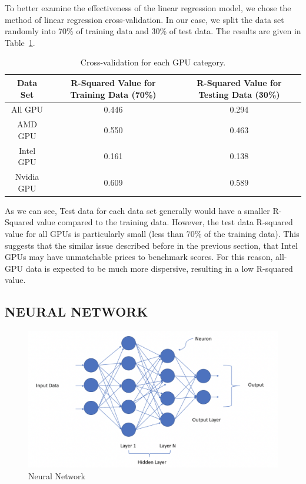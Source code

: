 \documentclass{scrartcl}
\begin{document}
To better examine the effectiveness of the linear regression model, we chose the method of linear regression cross-validation. In our case, we split the data set randomly into 70\% of training data and 30\% of test data. The results are given in Table~\ref{tab:CRSV}. 

\begin{table}[h!]
\centering
\begin{tabular}{|c | c | c|} 
 \hline
Data Set & R-Squared Value for Training Data (70\%) & R-Squared Value for Testing Data (30\%)\\ [0.5ex] 
 \hline\hline
 All GPU & 0.446 & 0.294 \\ 
 AMD GPU & 0.550 & 0.463 \\
 Intel GPU & 0.161 & 0.138 \\ 
 Nvidia GPU & 0.609 & 0.589 \\ [1ex] 
 \hline
\end{tabular}
\caption{Cross-validation for each GPU category.}
\label{tab:CRSV}
\end{table}

\noindent As we can see, Test data for each data set generally would have a smaller R-Squared value compared to the training data. However, the test data R-squared value for all GPUs is particularly small (less than 70\% of the training data). This suggests that the similar issue described before in the previous section, that Intel GPUs may have unmatchable prices to benchmark scores. For this reason, all-GPU data is expected to be much more dispersive, resulting in a low R-squared value. 



\subsection{NEURAL NETWORK}

\begin{figure}[H]
	\begin{center}
		\includegraphics[scale=0.3]{Graphics/Neural Network Images/NN1.png}
	\end{center}
	\caption{Neural Network}
	\label{fig:NN1}
\end{figure}
\end{document}
